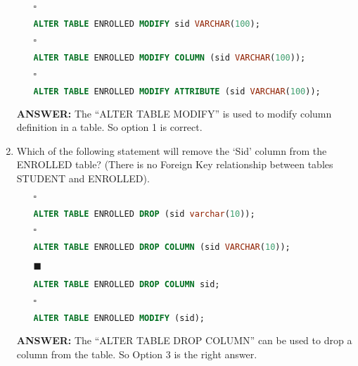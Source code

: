 \documentclass[10pt]{article}
\begin{document}
\begin{enumerate}
\begin{enumerate}
				\item[$\square$] 
					\begin{lstlisting}[language=SQL,firstline=1, lastline=1, numbers = right] 
						ALTER TABLE ENROLLED MODIFY sid VARCHAR(100);
					\end{lstlisting}
				
				\item[$\square$] 
					\begin{lstlisting}[language=SQL,firstline=1, lastline=1, numbers = right] 
						ALTER TABLE ENROLLED MODIFY COLUMN (sid VARCHAR(100));
					\end{lstlisting}
			
				\item[$\square$] 
					\begin{lstlisting}[language=SQL,firstline=1, lastline=1, numbers = right] 
						ALTER TABLE ENROLLED MODIFY ATTRIBUTE (sid VARCHAR(100));
					\end{lstlisting}
			\end{enumerate}
			\color{red} \textbf{ANSWER:} \color{black} The “ALTER TABLE MODIFY” is used to modify column definition in a table. So option 1 is correct.
		
		\item Which of the following statement will remove the ‘Sid’ column from the ENROLLED table? (There is no Foreign Key relationship between tables STUDENT and ENROLLED).
			\begin{enumerate}
				\item[$\square$] 
					\begin{lstlisting}[language=SQL,firstline=1, lastline=1, numbers = right] 
						ALTER TABLE ENROLLED DROP (sid varchar(10));
					\end{lstlisting}
				
				\item[$\square$] 
					\begin{lstlisting}[language=SQL,firstline=1, lastline=1, numbers = right] 
						ALTER TABLE ENROLLED DROP COLUMN (sid VARCHAR(10));
					\end{lstlisting}
				
				\item[$\blacksquare$]
					\begin{lstlisting}[language=SQL,firstline=1, lastline=1, numbers = right] 
						ALTER TABLE ENROLLED DROP COLUMN sid;
					\end{lstlisting}
				
				\item[$\square$]
					\begin{lstlisting}[language=SQL,firstline=1, lastline=1, numbers = right] 
						ALTER TABLE ENROLLED MODIFY (sid);
					\end{lstlisting}
			\end{enumerate}
			\color{red} \textbf{ANSWER:} \color{black} The “ALTER TABLE DROP COLUMN” can be used to drop a column from the table. So Option 3 is the right answer.


\end{enumerate}
\end{document}
